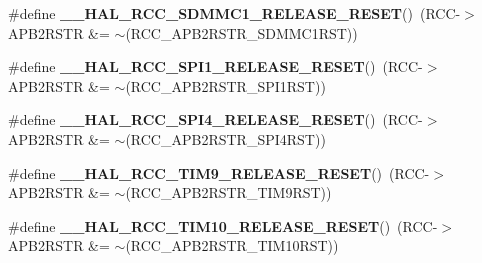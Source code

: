 \begin{DoxyCompactItemize}
\item 
\mbox{\label{group___r_c_c_ex___force___release___peripheral___reset_ga5ace3308265d0972961560ac0bb6c320}} 
\#define {\bfseries \+\_\+\+\_\+\+H\+A\+L\+\_\+\+R\+C\+C\+\_\+\+S\+D\+M\+M\+C1\+\_\+\+R\+E\+L\+E\+A\+S\+E\+\_\+\+R\+E\+S\+ET}()~(R\+CC-\/$>$A\+P\+B2\+R\+S\+TR \&= $\sim$(R\+C\+C\+\_\+\+A\+P\+B2\+R\+S\+T\+R\+\_\+\+S\+D\+M\+M\+C1\+R\+ST))
\item 
\mbox{\label{group___r_c_c_ex___force___release___peripheral___reset_gad7b4bc8c8a9146529a175c45eecf25e5}} 
\#define {\bfseries \+\_\+\+\_\+\+H\+A\+L\+\_\+\+R\+C\+C\+\_\+\+S\+P\+I1\+\_\+\+R\+E\+L\+E\+A\+S\+E\+\_\+\+R\+E\+S\+ET}()~(R\+CC-\/$>$A\+P\+B2\+R\+S\+TR \&= $\sim$(R\+C\+C\+\_\+\+A\+P\+B2\+R\+S\+T\+R\+\_\+\+S\+P\+I1\+R\+ST))
\item 
\mbox{\label{group___r_c_c_ex___force___release___peripheral___reset_ga8ac40732e63db2fff9e31d57b841c633}} 
\#define {\bfseries \+\_\+\+\_\+\+H\+A\+L\+\_\+\+R\+C\+C\+\_\+\+S\+P\+I4\+\_\+\+R\+E\+L\+E\+A\+S\+E\+\_\+\+R\+E\+S\+ET}()~(R\+CC-\/$>$A\+P\+B2\+R\+S\+TR \&= $\sim$(R\+C\+C\+\_\+\+A\+P\+B2\+R\+S\+T\+R\+\_\+\+S\+P\+I4\+R\+ST))
\item 
\mbox{\label{group___r_c_c_ex___force___release___peripheral___reset_ga71fee37e3aff2c5040e2e9f4e153f4ff}} 
\#define {\bfseries \+\_\+\+\_\+\+H\+A\+L\+\_\+\+R\+C\+C\+\_\+\+T\+I\+M9\+\_\+\+R\+E\+L\+E\+A\+S\+E\+\_\+\+R\+E\+S\+ET}()~(R\+CC-\/$>$A\+P\+B2\+R\+S\+TR \&= $\sim$(R\+C\+C\+\_\+\+A\+P\+B2\+R\+S\+T\+R\+\_\+\+T\+I\+M9\+R\+ST))
\item 
\mbox{\label{group___r_c_c_ex___force___release___peripheral___reset_ga704b80ff2f733e161d30e4138f90614d}} 
\#define {\bfseries \+\_\+\+\_\+\+H\+A\+L\+\_\+\+R\+C\+C\+\_\+\+T\+I\+M10\+\_\+\+R\+E\+L\+E\+A\+S\+E\+\_\+\+R\+E\+S\+ET}()~(R\+CC-\/$>$A\+P\+B2\+R\+S\+TR \&= $\sim$(R\+C\+C\+\_\+\+A\+P\+B2\+R\+S\+T\+R\+\_\+\+T\+I\+M10\+R\+ST))
\item 
\mbox{\label{group___r_c_c_ex___force___release___peripheral___reset_gab66378d2b26c2c47522f268e129b6709}} 

\end{DoxyCompactItemize}
